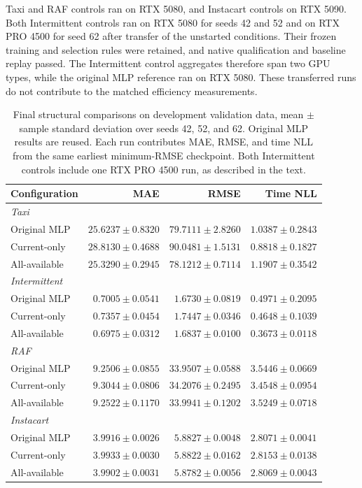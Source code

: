 \documentclass[runningheads]{llncs}
\begin{document}
Taxi and RAF controls ran on RTX 5080, and Instacart controls on RTX 5090.
Both Intermittent controls ran on RTX 5080 for seeds 42 and 52 and on RTX
PRO 4500 for seed 62 after transfer of the unstarted conditions. Their frozen
training and selection rules were retained, and native qualification and
baseline replay passed. The Intermittent control aggregates therefore span
two GPU types, while the original MLP reference ran on RTX 5080. These
transferred runs do not contribute to the matched efficiency measurements.

\begin{table}[t]
\caption{Final structural comparisons on development validation data,
mean $\pm$ sample standard deviation over seeds 42, 52, and 62. Original MLP
results are reused. Each run contributes MAE, RMSE, and time NLL from the
same earliest minimum-RMSE checkpoint. Both Intermittent controls include
one RTX PRO 4500 run, as described in the text.}
\label{tab:extension}\centering\small
\begin{tabular}{lrrr}
\toprule
Configuration & MAE & RMSE & Time NLL\\
\midrule
\multicolumn{4}{l}{\textit{Taxi}}\\
Original MLP & $25.6237\pm0.8320$ & $79.7111\pm2.8260$ & $1.0387\pm0.2843$\\
Current-only & $28.8130\pm0.4688$ & $90.0481\pm1.5131$ & $0.8818\pm0.1827$\\
All-available & $25.3290\pm0.2945$ & $78.1212\pm0.7114$ & $1.1907\pm0.3542$\\
\midrule
\multicolumn{4}{l}{\textit{Intermittent}}\\
Original MLP & $0.7005\pm0.0541$ & $1.6730\pm0.0819$ & $0.4971\pm0.2095$\\
Current-only & $0.7357\pm0.0454$ & $1.7447\pm0.0346$ & $0.4648\pm0.1039$\\
All-available & $0.6975\pm0.0312$ & $1.6837\pm0.0100$ & $0.3673\pm0.0118$\\
\midrule
\multicolumn{4}{l}{\textit{RAF}}\\
Original MLP & $9.2506\pm0.0855$ & $33.9507\pm0.0588$ & $3.5446\pm0.0669$\\
Current-only & $9.3044\pm0.0806$ & $34.2076\pm0.2495$ & $3.4548\pm0.0954$\\
All-available & $9.2522\pm0.1170$ & $33.9941\pm0.1202$ & $3.5249\pm0.0718$\\
\midrule
\multicolumn{4}{l}{\textit{Instacart}}\\
Original MLP & $3.9916\pm0.0026$ & $5.8827\pm0.0048$ & $2.8071\pm0.0041$\\
Current-only & $3.9933\pm0.0030$ & $5.8822\pm0.0162$ & $2.8153\pm0.0138$\\
All-available & $3.9902\pm0.0031$ & $5.8782\pm0.0056$ & $2.8069\pm0.0043$\\
\bottomrule
\end{tabular}
\end{table}
\end{document}
